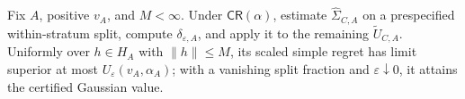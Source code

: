 Fix \(A\), positive \(v_A\), and \(M<\infty\). Under \(\mathsf{CR}(\alpha)\), estimate \(\widehat\Sigma_{C,A}\) on a prespecified within-stratum split, compute \(\delta_{\varepsilon,A}\), and apply it to the remaining \(\widetilde U_{C,A}\). Uniformly over \(h\in H_A\) with \(\lVert h\rVert\leq M\), its scaled simple regret has limit superior at most \(U_\varepsilon(v_A,\alpha_A)\); with a vanishing split fraction and \(\varepsilon\downarrow0\), it attains the certified Gaussian value.